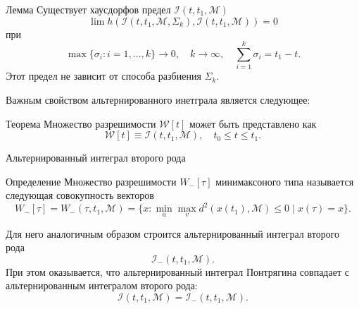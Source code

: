\documentclass{beamer}
\begin{document}
\begin{frame}
    \begin{block}{Лемма}
    Существует хаусдорфов предел \( \mathcal{I}(t, t_1, \mathcal{M}) \)
    \[
        \lim h \left( \mathcal{I}(t, t_1, \mathcal{M}, \Sigma_k), \mathcal{I}(t, t_1, \mathcal{M})
         \right) = 0
    \]
    при 
    \[
        \max\{\sigma_i: i = 1,\dots, k \} \to 0, \quad k \to \infty, \quad \sum_{i = 1}^k \sigma_i 
         = t_1 - t. 
    \]
    Этот предел не зависит от способа разбиения \( \Sigma_k \).
    \end{block}
    Важным свойством альтернированного инетграла является следующее:
\begin{block}{Теорема}
    Множество разрешимости \( \mathcal{W}[t] \) может быть представлено как 
    \begin{equation*}
        \mathcal{W}[t] \equiv \mathcal{I}(t, t_1, \mathcal{M}), \quad
         t_0 \le t \le t_1.
    \end{equation*}
\end{block}
\end{frame}

\begin{frame}{Альтернированный интеграл второго рода}
    \begin{block}{Определение}
    Множество разрешимости \( W_-[\tau] \) минимаксоного типа называется следующая совокупность
     векторов
    \[
        W_-[\tau] = W_-(\tau, t_1, \mathcal{M}) = \{ x : \min_u \max_v d^2(x(t_1),
         \mathcal{M}) \le 0 \mid x(\tau) = x \}.
    \]
    \end{block}
    Для него аналогичным образом строится альтернированный интеграл второго рода
    \begin{equation*}
        \mathcal{I}_-(t, t_1, \mathcal{M}).
    \end{equation*}
    При этом оказывается, что альтернированный интеграл Понтрягина совпадает с альтернированным интегралом второго рода:
    \begin{equation*}
        \mathcal{I}(t, t_1, \mathcal{M}) = \mathcal{I}_-(t, t_1, \mathcal{M}).
    \end{equation*}
\end{frame}
\end{document}
